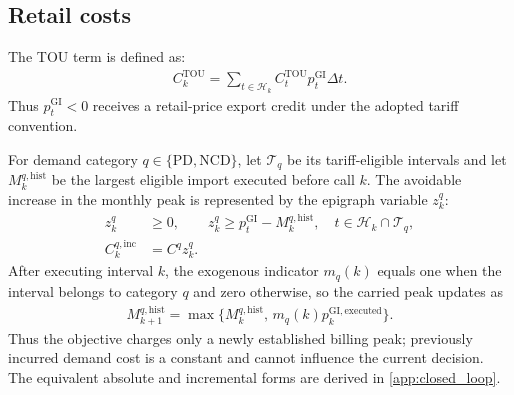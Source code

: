 \documentclass[final,5p,times]{elsarticle}
\newcommand{\dt}{\Delta t}
\newcommand{\GI}{\mathrm{GI}}
\newcommand{\TOU}{\mathrm{TOU}}
\newcommand{\PD}{\mathrm{PD}}
\newcommand{\NCD}{\mathrm{NCD}}
\newcommand{\hist}{\mathrm{hist}}
\newcommand{\calT}{\mathcal{T}}
\newcommand{\calH}{\mathcal{H}}
\begin{document}
\subsection{Retail costs}
The TOU term is defined as:
\begin{align}
C_k^{\TOU}
=\sum_{t\in\calH_k}C_t^{\TOU}p_t^{\GI}\dt. \label{eq:tou}
\end{align}
Thus $p_t^{\GI}<0$ receives a retail-price export credit under the adopted
tariff convention.

For demand category $q\in\{\PD,\NCD\}$, let $\calT_q$ be its tariff-eligible
intervals and let $M_k^{q,\hist}$ be the largest eligible import executed
before call $k$. The avoidable increase in the monthly peak is represented by
the epigraph variable $z_k^q$:
\begin{align}
z_k^q&\ge0, \qquad
z_k^q\ge p_t^{\GI}-M_k^{q,\hist},
\quad t\in\calH_k\cap\calT_q, \label{eq:demand_epi}\\
C_k^{q,\mathrm{inc}}&=C^q z_k^q. \label{eq:demand_inc}
\end{align}
After executing interval $k$, the exogenous indicator $m_q(k)$ equals one when
the interval belongs to category $q$ and zero otherwise, so the carried peak
updates as
\begin{align}
M_{k+1}^{q,\hist}
=\max\{M_k^{q,\hist},\,m_q(k)p_k^{\GI,\mathrm{executed}}\}. \label{eq:threshold_update}
\end{align}
Thus the objective charges only a newly established billing peak; previously
incurred demand cost is a constant and cannot influence the current decision.
The equivalent absolute and incremental forms are derived in \ref{app:closed_loop}.
\end{document}
